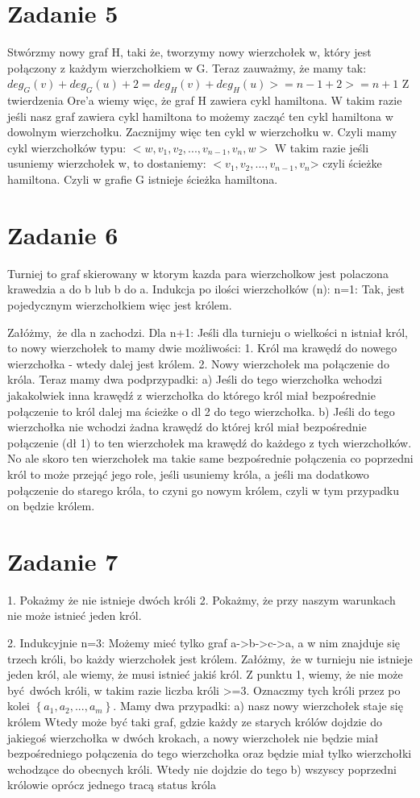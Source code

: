 \documentclass[12pt]{article}
\newcommand{\set}[1]{\left \{ #1 \right \}}				%
\begin{document}
\section{Zadanie 5}%
Stwórzmy nowy graf H, taki że, tworzymy nowy wierzchołek w, który jest połączony z każdym wierzchołkiem w G. 
Teraz zauważmy, że mamy tak:
$deg_G(v) + deg_G(u) + 2 = deg_H(v) + deg_H(u) >= n-1 + 2 >= n+1$
Z twierdzenia Ore'a wiemy więc, że graf H zawiera cykl hamiltona.
W takim razie jeśli nasz graf zawiera cykl hamiltona to możemy zacząć ten cykl hamiltona w dowolnym wierzchołku. Zacznijmy więc ten cykl w wierzchołku w. Czyli mamy cykl wierzchołków typu:
$<w, v_1, v_2, ..., v_{n-1}, v_n, w>$
W takim razie jeśli usuniemy wierzchołek w, to dostaniemy:
$<v_1, v_2, ..., v_{n-1}, v_n$> czyli ścieżke hamiltona. Czyli w grafie G istnieje ścieżka hamiltona.


\section{Zadanie 6} %
Turniej to graf skierowany w ktorym kazda para wierzcholkow jest polaczona krawedzia a do b lub b do a. 
Indukcja po ilości wierzchołków (n):
n=1:
Tak, jest pojedycznym wierzchołkiem więc jest królem.

Załóżmy, że dla n zachodzi. Dla n+1:
Jeśli dla turnieju o wielkości n istniał król, to nowy wierzchołek to mamy dwie możliwości:
1. Król ma krawędź do nowego wierzchołka - wtedy dalej jest królem.
2. Nowy wierzchołek ma połączenie do króla. 
Teraz mamy dwa podprzypadki:
a) Jeśli do tego wierzchołka wchodzi jakakolwiek inna krawędź z wierzchołka do którego król miał bezpośrednie połączenie to król dalej ma ścieżke o dl 2 do tego wierzchołka. 
b) Jeśli do tego wierzchołka nie wchodzi żadna krawędź do której król miał bezpośrednie połączenie (dł 1) to ten wierzchołek ma krawędź do każdego z tych wierzchołków. No ale skoro ten wierzchołek ma takie same bezpośrednie połączenia co poprzedni król to może przejąć jego role, jeśli usuniemy króla, a jeśli ma dodatkowo połączenie do starego króla, to czyni go nowym królem, czyli w tym przypadku on będzie królem.

\section{Zadanie 7} %
1. Pokażmy że nie istnieje dwóch króli 
2. Pokażmy, że przy naszym warunkach nie może istnieć jeden król. 


2. Indukcyjnie 
n=3:
Możemy mieć tylko graf a->b->c->a, a w nim znajduje się trzech króli, bo każdy wierzchołek jest królem.
Załóżmy, że w turnieju nie istnieje jeden król, ale wiemy, że musi istnieć jakiś król. Z punktu 1, wiemy, że nie może być dwóch króli, w takim razie liczba króli >=3. 
Oznaczmy tych króli przez po kolei $\set{a_1, a_2, ..., a_m}$.
Mamy dwa przypadki:
a) nasz nowy wierzchołek staje się królem 
Wtedy może być taki graf, gdzie każdy ze starych królów dojdzie do jakiegoś wierzchołka w dwóch krokach, a nowy wierzchołek nie będzie miał bezpośredniego połączenia do tego wierzchołka oraz będzie miał tylko wierzchołki wchodzące do obecnych króli. Wtedy nie dojdzie do tego 
b) wszyscy poprzedni królowie oprócz jednego tracą status króla
\end{document}
